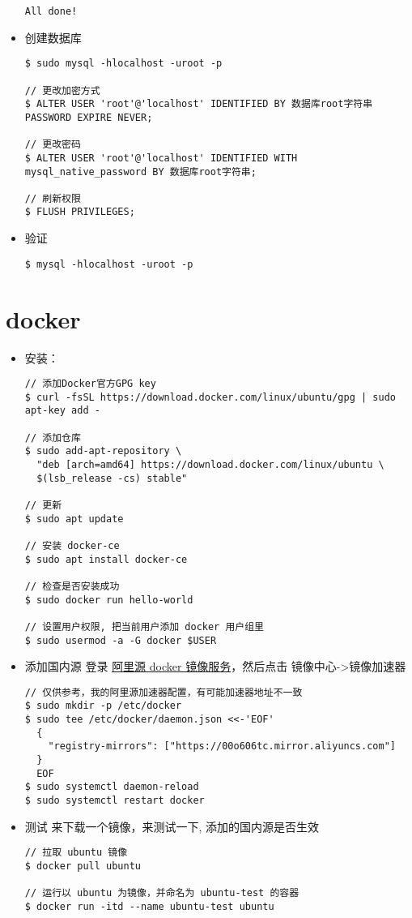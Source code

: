 \begin{itemize}
\begin{lstlisting}
All done! 
\end{lstlisting}

\item 创建数据库
\begin{lstlisting}
$ sudo mysql -hlocalhost -uroot -p

// 更改加密方式
$ ALTER USER 'root'@'localhost' IDENTIFIED BY 数据库root字符串 PASSWORD EXPIRE NEVER;

// 更改密码
$ ALTER USER 'root'@'localhost' IDENTIFIED WITH mysql_native_password BY 数据库root字符串;

// 刷新权限
$ FLUSH PRIVILEGES;
\end{lstlisting}

\item 验证
\begin{lstlisting}
$ mysql -hlocalhost -uroot -p
\end{lstlisting}
\end{itemize}


\section{docker}

\begin{itemize}
\item 安装：
\begin{lstlisting}
// 添加Docker官方GPG key
$ curl -fsSL https://download.docker.com/linux/ubuntu/gpg | sudo apt-key add -

// 添加仓库
$ sudo add-apt-repository \
  "deb [arch=amd64] https://download.docker.com/linux/ubuntu \
  $(lsb_release -cs) stable"

// 更新 
$ sudo apt update

// 安装 docker-ce 
$ sudo apt install docker-ce

// 检查是否安装成功 
$ sudo docker run hello-world

// 设置用户权限, 把当前用户添加 docker 用户组里
$ sudo usermod -a -G docker $USER

\end{lstlisting}

\item 添加国内源 
登录 \href{https://cr.console.aliyun.com/cn-hangzhou/instances/mirrors}{阿里源 docker 镜像服务}，然后点击 镜像中心->镜像加速器
\begin{lstlisting}
// 仅供参考，我的阿里源加速器配置，有可能加速器地址不一致
$ sudo mkdir -p /etc/docker
$ sudo tee /etc/docker/daemon.json <<-'EOF'
  {
    "registry-mirrors": ["https://00o606tc.mirror.aliyuncs.com"]
  }
  EOF
$ sudo systemctl daemon-reload
$ sudo systemctl restart docker
\end{lstlisting}

\item 测试
来下载一个镜像，来测试一下, 添加的国内源是否生效
\begin{lstlisting}
// 拉取 ubuntu 镜像
$ docker pull ubuntu

// 运行以 ubuntu 为镜像，并命名为 ubuntu-test 的容器 
$ docker run -itd --name ubuntu-test ubuntu
\end{lstlisting}
\end{itemize}


